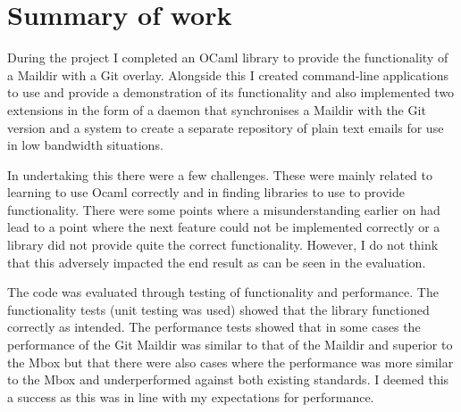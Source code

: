 \section{Summary of work}

During the project I completed an OCaml library to provide the functionality of a Maildir with a Git overlay. Alongside this I created command-line applications to use and provide a demonstration of its functionality and also implemented two extensions in the form of a daemon that synchronises a Maildir with the Git version and a system to create a separate repository of plain text emails for use in low bandwidth situations.

In undertaking this there were a few challenges. These were mainly related to learning to use Ocaml correctly and in finding libraries to use to provide functionality. There were some points where a misunderstanding earlier on had lead to a point where the next feature could not be implemented correctly or a library did not provide quite the correct functionality. However, I do not think that this adversely impacted the end result as can be seen in the evaluation.

The code was evaluated through testing of functionality and performance. The functionality tests (unit testing was used) showed that the library functioned correctly as intended. The performance tests showed that in some cases the performance of the Git Maildir was similar to that of the Maildir and superior to the Mbox but that there were also cases where the performance was more similar to the Mbox and underperformed against both existing standards. I deemed this a success as this was in line with my expectations for performance.

